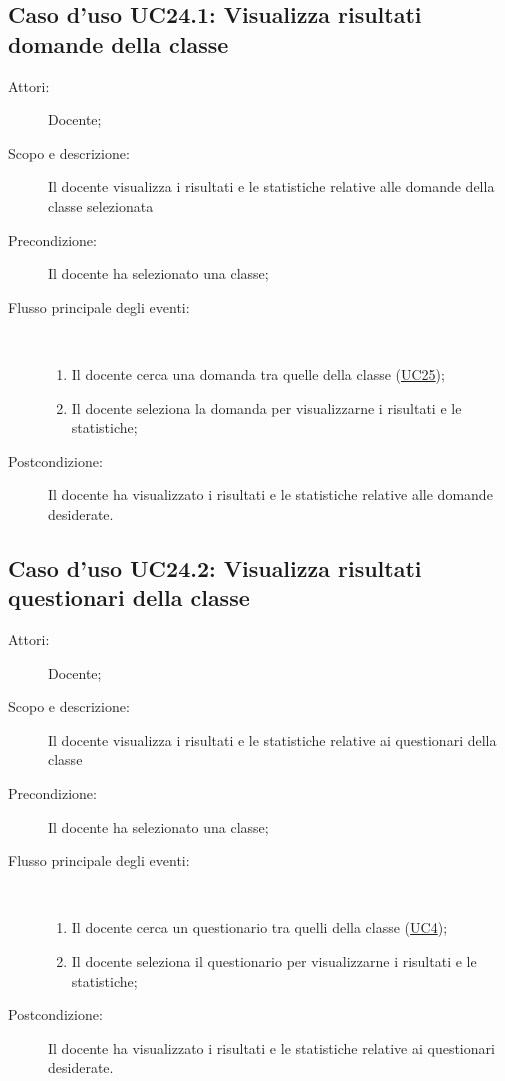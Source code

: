 \subsection{Caso d'uso UC24.1: Visualizza risultati domande della classe}\begin{description}
	\item[Attori:] Docente;
	\item[Scopo e descrizione:] Il docente visualizza i risultati e le statistiche relative alle domande della classe selezionata
	\item[Precondizione:] Il docente ha selezionato una classe;
	
	\item[Flusso principale degli eventi:] \ 
	\begin{enumerate}
		\item Il docente cerca una domanda tra quelle della classe (\hyperlink{UC25}{UC25});
		\item Il docente seleziona la domanda per visualizzarne i risultati e le statistiche;
		
	\end{enumerate}
	\item[Postcondizione:] Il docente ha visualizzato i risultati e le statistiche relative alle domande desiderate.
\end{description}
\hypertarget{UC24.2}{}
\subsection{Caso d'uso UC24.2: Visualizza risultati questionari della classe}\begin{description}
	\item[Attori:] Docente;
	\item[Scopo e descrizione:] Il docente visualizza i risultati e le statistiche relative ai questionari della classe
	\item[Precondizione:] Il docente ha selezionato una classe;
	
	\item[Flusso principale degli eventi:] \ 
	\begin{enumerate}
		\item Il docente cerca un questionario tra quelli della classe (\hyperlink{UC4}{UC4});
		\item Il docente seleziona il questionario per visualizzarne i risultati e le statistiche;
		
	\end{enumerate}
	\item[Postcondizione:] Il docente ha visualizzato i risultati e le statistiche relative ai questionari desiderate.
\end{description}
\hypertarget{UC24.3}{}
